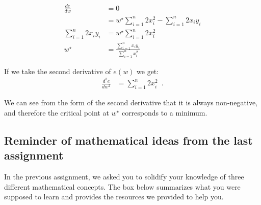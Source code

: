 \documentclass[assignment02_Solutions]{subfiles}
\begin{document}
\begin{exercise}[(20 minutes)]
\begin{boxedsolution}
\begin{align}
\frac{de}{dw} &= 0 \\
&= w^\star \sum_{i=1}^n 2 x_i^2 - \sum_{i=1}^n 2 x_i y_i \\
\sum_{i=1}^n 2 x_i y_i  &= w^\star \sum_{i=1}^n 2 x_i^2 \\
w^\star &=\frac{\sum_{i=1}^n x_i y_i}{\sum_{i=1}^n x_i^2}
\end{align}

If we take the second derivative of $e(w)$ we get:
\begin{align}
\frac{d^2e}{dw^2} &= \sum_{i=1}^n 2x_i^2 \enspace .
\end{align}

We can see from the form of the second derivative that it is always non-negative, and therefore the critical point at $w^\star$ corresponds to a minimum.
\end{boxedsolution}
\ees


\end{exercise}

\subsection{Reminder of mathematical ideas from the last assignment}

In the previous assignment, we asked you to solidify your knowledge of three different mathematical concepts.  The box below summarizes what you were supposed to learn and provides the resources we provided to help you.
\end{document}
